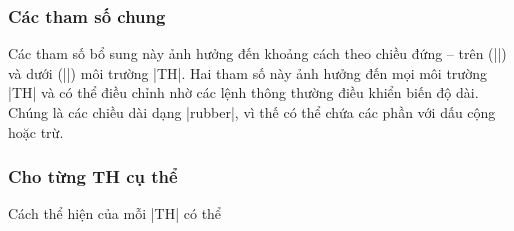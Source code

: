 \documentclass[11pt,oneside]{ltxdoc}
\theoremstyle{marginbreak}
\theoremstyle{changebreak}
\theoremstyle{change}
\theoremstyle{plain}
\theoremstyle{nonumberplain}
\begin{document}

\subsubsection{Các tham số chung}

\DescribeMacro\theorempreskipamount
\DescribeMacro\theorempostskipamount 
Các tham số bổ sung này ảnh hưởng đến khoảng cách theo chiều đứng --
trên (|\theorempreskipamount|) và dưới (|\theorempostskipamount|) môi trường |TH|.
Hai tham số này ảnh hưởng đến mọi môi trường |TH| và có thể điều chỉnh
nhờ các lệnh thông thường điều khiển biến độ dài. Chúng là các chiều dài
dạng |rubber|, vì thế có thể chứa các phần với dấu cộng hoặc trừ.

\subsubsection{Cho từng TH cụ thể}

Cách thể hiện của mỗi |TH| có thể 
\end{document}
